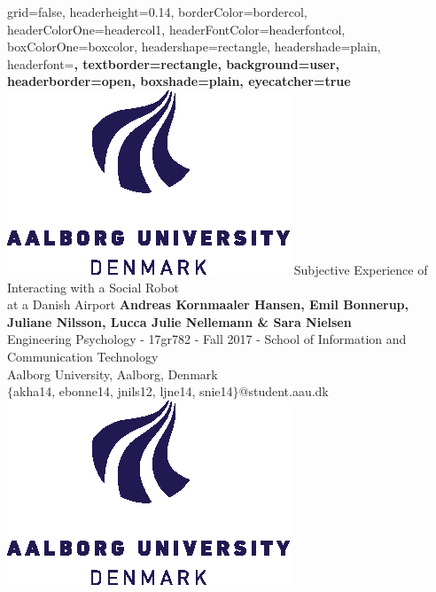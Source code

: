 \documentclass[paperwidth=118cm,paperheight=84cm,landscape,fontscale=0.2941]{baposter}
\begin{document}
\graphicspath{{Pictures/}}
\background{ %

}

\begin{poster}{
grid=false,
headerheight=0.14\textheight,
borderColor=bordercol, %
headerColorOne=headercol1, %
headerFontColor=headerfontcol, %
boxColorOne=boxcolor, %
headershape=rectangle, %
headershade=plain,
headerfont=\Large\sf\bf, %
textborder=rectangle,
background=user,
headerborder=open, %
boxshade=plain,
eyecatcher=true
}
%
%
{
\includegraphics[height=0.10\textheight]{aau_logo_new.eps}
} %
{\vspace{2pt}
Subjective Experience of Interacting with a Social Robot \\
at a Danish Airport}
{
\vspace{3pt}
\normalsize{\textbf{Andreas Kornmaaler Hansen, Emil Bonnerup, Juliane Nilsson, Lucca Julie Nellemann \& Sara Nielsen}\\
Engineering Psychology - 17gr782 - Fall 2017 - School of Information and Communication Technology\\ Aalborg University, Aalborg, Denmark\\ }
$\{$akha14, ebonne14, jnils12, ljne14, snie14$\}$@student.aau.dk\\
}
{
\includegraphics[height=0.10\textheight]{aau_logo_new.eps}
}


\end{poster}
\end{document}
